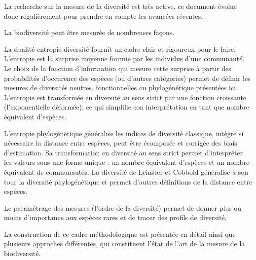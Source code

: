 \documentclass[
  11pt,
  french,
  a4paper,
  extrafontsizes,onecolumn,openright
  ]{memoir}
\begin{document}
La recherche sur la mesure de la diversité est très active, ce document évolue donc régulièrement pour prendre en compte les avancées récentes.



\backmatter
\SmallMargins

%
\twocolumn
\renewcommand*{\bibfont}{\scriptsize}
\printbibliography
\onecolumn










\evenpage
\SmallMargins
\thispagestyle{empty}

\begin{normalsize}

\begin{description}

\item[Résumé:]
La biodiversité peut être mesurée de nombreuses façons.

La dualité entropie-diversité fournit un cadre clair et rigoureux pour le faire.
L'entropie est la surprise moyenne fournie par les individus d'une communauté.
Le choix de la fonction d'information qui mesure cette surprise à partir des probabilités d'occurence des espèces (ou d'autres catégories) permet de définir les mesures de diversités neutres, fonctionnelles ou phylogénétique présentées ici.
L'entropie est transformée en diversité au sens strict par une fonction croissante (l'exponentielle déformée), ce qui simplifie son interprétation en tant que nombre équivalent d'espèces.

L'entropie phylogénétique généralise les indices de diversité classique, intègre si nécessaire la distance entre espèces, peut être écomposée et corrigée des biais d'estimation.
Sa transformation en diversité au sens strict permet d'interpréter les valeurs sous une forme unique : un nombre équivalent d'espèces et un nombre équivalent de communautés.
La diversité de Leinster et Cobbold généralise à son tour la diversité phylogénétique et permet d'autres définitions de la distance entre espèces.

Le paramétrage des mesures (l'ordre de la diversité) permet de donner plus ou moins d'importance aux espèces rares et de tracer des profils de diversité.

La construction de ce cadre méthodologique est présentée en détail ainsi que plusieurs approches différentes, qui constituent l'état de l'art de la mesure de la biodiversité.

~\\



\end{description}

\end{normalsize}
\end{document}

